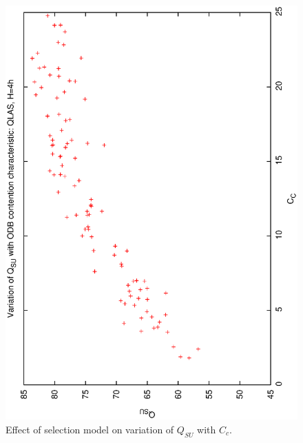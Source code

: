 \begin{figure}[h]
 \label{fig:qsucc_ql4}
\begin{center}
 \includegraphics[scale=0.5, angle=-90]{figures/qsucc_ql4.eps}
 \caption[Effect of selection model on variation of $Q_{SU}$ with $C_c$.] 
   {Effect of selection model on variation of $Q_{SU}$ with $C_c$.}
\end{center}
\end{figure}


